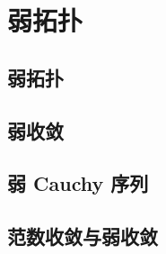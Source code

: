 \section{弱拓扑}
\label{b1:sec:0901}


\subsection{弱拓扑}
\label{b1:subsec:090101}

\subsection{弱收敛}
\label{b1:subsec:090102}

\subsection{弱 Cauchy 序列}
\label{b1:subsec:090103}

\subsection{范数收敛与弱收敛}
\label{b1:subsec:090104}


